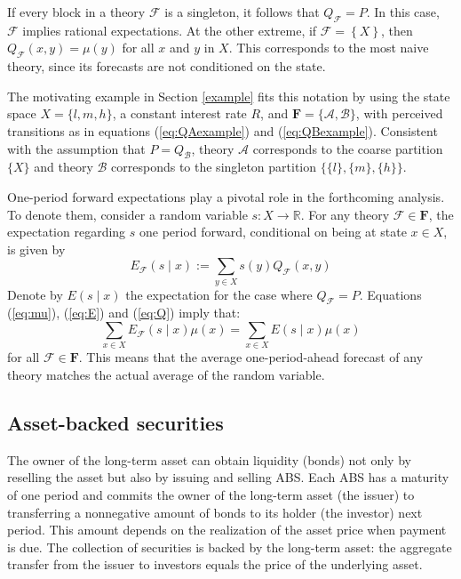 \documentclass[11pt]{article}
\theoremstyle{plain}
\begin{document}
If every block in a theory $\mathcal{F}$ is a singleton, it follows that $Q_\mathcal{F}=P$. In this case, $\mathcal{F}$ implies rational expectations. At the other extreme, if $\mathcal{F}=\left\{X\right\}$, then $Q_{\mathcal{F}}\left(x,y\right)=\mu(y)$ for all $x$ and $y$ in $X$. This corresponds to the most naive theory, since its forecasts are not conditioned on the state.

The motivating example in Section \ref{example} fits this notation by using the state space $X=\{l,m,h\}$, a constant interest rate $R$, and $\mathbf{F}=\{\mathcal{A},\mathcal{B}\}$, with perceived transitions as in equations (\ref{eq:QAexample}) and (\ref{eq:QBexample}). Consistent with the assumption that $P=Q_{\mathcal{B}}$, theory $\mathcal{A}$ corresponds to the coarse partition $\{X\}$ and theory $\mathcal{B}$ corresponds to the singleton partition $\{\{l\},\{m\},\{h\}\}$.

One-period forward expectations play a pivotal role in the forthcoming analysis. To denote them, consider a random variable $s:X\to\mathbb{R}$. For any theory $\mathcal{F} \in \mathbf{F}$, the expectation regarding $s$ one period forward, conditional on being at state $x\in X$, is given by
\begin{equation}\label{eq:E}
E_{\mathcal{F}}\left(s\mid x\right):=\sum_{y\in X}s(y)Q_{\mathcal{F}}\left(x,y\right)
\end{equation}
Denote by $E\left(s\mid x\right)$ the expectation for the case where $Q_\mathcal{F}=P$. Equations (\ref{eq:mu}), (\ref{eq:E}) and (\ref{eq:Q}) imply that:
\begin{equation*}
\sum_{x\in X}E_{\mathcal{F}}\left(s\mid x\right)\mu(x)=\sum_{x\in X}E\left(s\mid x\right)\mu(x)
\end{equation*} for all $\mathcal{F}\in\mathbf{F}$. This means that the average one-period-ahead forecast of any theory matches the actual average of the random variable.

\subsection{Asset-backed securities}

The owner of the long-term asset can obtain liquidity (bonds) not only by reselling the asset but also by issuing and selling ABS. Each ABS has a maturity of one period and commits the owner of the long-term asset (the issuer) to transferring a nonnegative amount of bonds to its holder (the investor) next period. This amount depends on the realization of the asset price when payment is due. The collection of securities is backed by the long-term asset: the aggregate transfer from the issuer to investors equals the price of the underlying asset.
\end{document}
